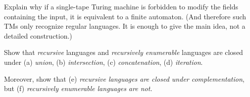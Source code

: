 \documentclass[a4paper,12pt]{amsart}
\begin{document}
\begin{problem}

    Explain why if a single-tape Turing machine is forbidden to modify the fields containing the input, it is equivalent to a finite automaton. (And therefore such TMs only recognize regular languages. It is enough to give the main idea, not a detailed construction.)

\end{problem}
    

\begin{problem}
    
    Show that \emph{recursive} languages and \emph{recursively enumerable} languages are closed under (a) \emph{union}, (b) \emph{intersection}, (c) \emph{concatenation}, (d) \emph{iteration}.
    
    Moreover, show that (e) \emph{recursive languages are closed under complementation}, but (f) \emph{recursively enumerable languages are not.}


\end{problem}
    
\end{document}
